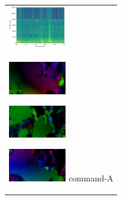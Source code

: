 \begin{enumerate}
\begin{end}
\begin{figure}[H]
\begin{tabular}{l}
\begin{minipage}{0.165\hsize}
\begin{center}
        \end{center}
      \end{minipage}
      \begin{minipage}{0.165\hsize}
        \begin{center}
          \includegraphics[clip, width=2.5cm]{./Figures/sound_commandmatemate.eps}
        \end{center}
      \end{minipage}
\\  %
      \begin{minipage}{0.165\hsize}
        \begin{center}
          \includegraphics[clip, width=2.5cm]{./Figures/optic_commandmatemate1.eps}
          \hspace{0.3cm} { }
        \end{center}
      \end{minipage}
      \begin{minipage}{0.165\hsize}
        \begin{center}
          \includegraphics[clip, width=2.5cm]{./Figures/optic_commandmatemate2.eps}
          \hspace{0.0cm} { }
        \end{center}
      \end{minipage}
      \begin{minipage}{0.165\hsize}
        \begin{center}
          \includegraphics[clip, width=2.5cm]{./Figures/optic_commandmatemate3.eps}
          \hspace{0.0cm} {command-A}
        \end{center}
      \end{minipage}

\end{tabular}
\end{figure}
\end{end}
\end{enumerate}
